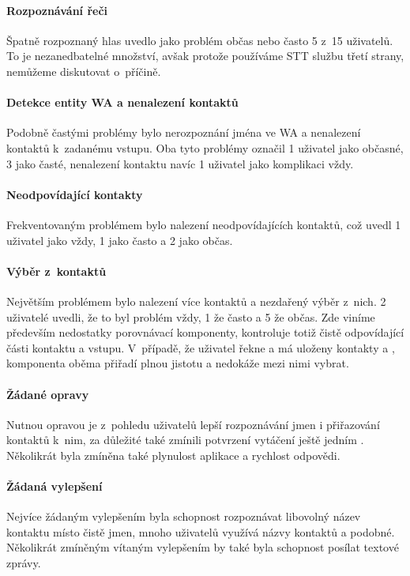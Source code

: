 \paragraph{Rozpoznávání řeči} Špatně rozpoznaný hlas uvedlo jako problém občas nebo často 5 z~15 uživatelů.
To je nezanedbatelné množství, avšak protože používáme STT službu
třetí strany, nemůžeme diskutovat o~příčině.

\paragraph{Detekce entity WA a nenalezení kontaktů} Podobně častými problémy bylo nerozpoznání
jména ve WA a nenalezení kontaktů k~zadanému vstupu. Oba
tyto problémy označil 1 uživatel jako občasné, 3 jako časté, nenalezení kontaktu
navíc 1 uživatel jako komplikaci vždy.

\paragraph{Neodpovídající kontakty} Frekventovaným problémem bylo nalezení neodpovídajících kontaktů,
což u\-ve\-dl 1 uživatel jako vždy, 1 jako často a 2 jako občas.

\paragraph{Výběr z~kontaktů} Největším problémem bylo nalezení více kontaktů a nezdařený výběr z~nich.
2 uživatelé uvedli, že to byl problém vždy, 1 že často a 5 že
občas. Zde viníme především nedostatky porovnávací komponenty, kontroluje
totiž čistě odpovídající části kontaktu a vstupu. V~případě, že uživatel
řekne  a má uloženy kontakty  a ,
komponenta oběma přiřadí plnou jistotu a nedokáže mezi nimi vybrat.

\paragraph{Žádané opravy} Nutnou opravou je z~pohledu uživatelů lepší rozpoznávání jmen i přiřazování
kontaktů k~nim, za důležité také zmínili potvrzení vytáčení ještě jedním
. Několikrát byla zmíněna také plynulost aplikace a rychlost
odpovědi.

\paragraph{Žádaná vylepšení} Nejvíce žádaným vylepšením byla schopnost rozpoznávat libovolný název kontaktu
místo čistě jmen, mnoho uživatelů využívá názvy kontaktů  a podobné.
Několikrát zmíněným vítaným vylepšením by také byla schopnost posílat textové
zprávy.

